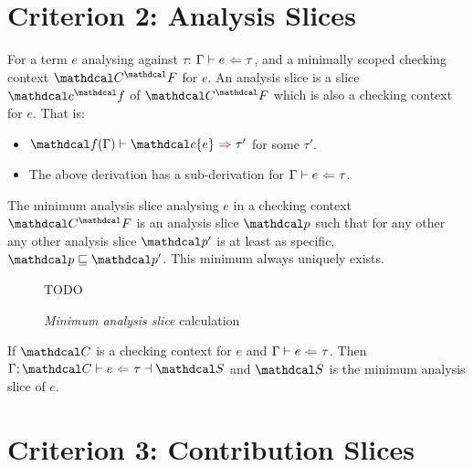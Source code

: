 \section{Criterion 2: Analysis Slices}
\begin{definition}\label{def:analysisslice}
For a term $e$ analysing against $\tau$: $\analysis{e}{\tau}$, and a minimally scoped checking context $\C^\F$ for $e$. An analysis slice is a slice $\Cs^\f$ of $\C^\F$ which is also a checking context for $e$. That is:
\begin{itemize}
\item $\synthesis[\f(\Gamma)]{\Cs\{e\}}{\tau'}$ for some $\tau'$.
\item The above derivation has a sub-derivation for $\analysis{e}{\tau}$. 
\end{itemize}
\end{definition}
\begin{conjecture}\label{conj:AnalysisSliceUniqueness}
The minimum analysis slice analysing $e$ in a checking context $\C^\F$ is an analysis slice $\p$ such that for any other any other analysis slice $\p'$ is at least as specific, $\p \sqsubseteq \p'$. This minimum always uniquely exists.
\end{conjecture}

\begin{figure}[h]
TODO
\caption{\textit{Minimum analysis slice} calculation}
\label{fig:AnalsisSlices}
\end{figure}

\begin{conjecture}[Correctness]\label{conj:AnalysisSliceCorrectness}
If $\C$ is a checking context for $e$ and $\analysis{e}{\tau}$. Then $\analysisslice{\C}{e}{\tau}{\S}$ and $\S$ is the minimum analysis slice of $e$.
\end{conjecture}

\section{Criterion 3: Contribution Slices}

